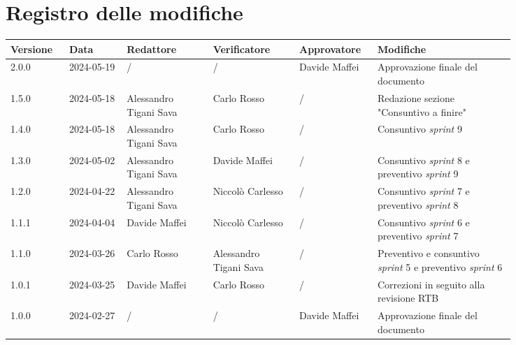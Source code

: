 \section*{Registro delle modifiche}
 {
  \renewcommand{\arraystretch}{1.5}
  \scriptsize
  \begin{longtable}{p{0.10\linewidth}p{0.10\linewidth}p{0.15\linewidth}p{0.15\linewidth}p{0.10\linewidth}p{0.24\linewidth}}
	  \textbf{Versione} & \textbf{Data} & \textbf{Redattore}     & \textbf{Verificatore}  & \textbf{Approvatore} & \textbf{Modifiche}                                                       \\
	  \toprule
	  2.0.0             & 2024-05-19    & /                      & /                      & Davide Maffei        & Approvazione finale del documento                                        \\
	  \hline
	  1.5.0             & 2024-05-18    & Alessandro Tigani Sava & Carlo Rosso            & /                    & Redazione sezione "Consuntivo a finire"                                  \\
	  \hline
	  1.4.0             & 2024-05-18    & Alessandro Tigani Sava & Carlo Rosso            & /                    & Consuntivo \textit{sprint} 9                                             \\
	  \hline
	  1.3.0             & 2024-05-02    & Alessandro Tigani Sava & Davide Maffei          & /                    & Consuntivo \textit{sprint} 8 e preventivo \textit{sprint} 9              \\
	  \hline
	  1.2.0             & 2024-04-22    & Alessandro Tigani Sava & Niccolò Carlesso       & /                    & Consuntivo \textit{sprint} 7 e preventivo \textit{sprint} 8              \\
	  \hline
	  1.1.1             & 2024-04-04    & Davide Maffei          & Niccolò Carlesso       & /                    & Consuntivo \textit{sprint} 6 e preventivo \textit{sprint} 7              \\
	  \hline
	  1.1.0             & 2024-03-26    & Carlo Rosso            & Alessandro Tigani Sava & /                    & Preventivo e consuntivo \textit{sprint} 5 e preventivo \textit{sprint} 6 \\
	  \hline
	  1.0.1             & 2024-03-25    & Davide Maffei          & Carlo Rosso            & /                    & Correzioni in seguito alla revisione RTB                                 \\
	  \hline
	  1.0.0             & 2024-02-27    & /                      & /                      & Davide Maffei        & Approvazione finale del documento                                        \\

\end{longtable}}
